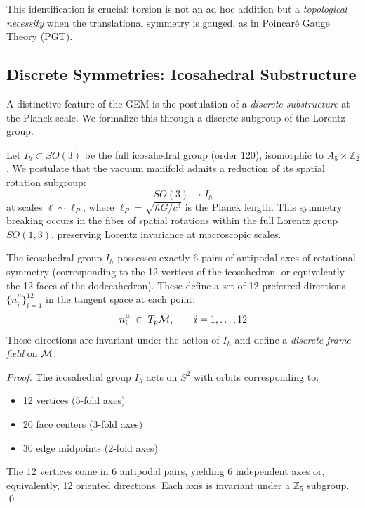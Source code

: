 This identification is crucial: torsion is not an ad hoc addition but a \textit{topological necessity} when the translational symmetry is gauged, as in Poincaré Gauge Theory (PGT).

\subsection{Discrete Symmetries: Icosahedral Substructure}

A distinctive feature of the GEM is the postulation of a \textit{discrete substructure} at the Planck scale. We formalize this through a discrete subgroup of the Lorentz group.


\begin{definition}
Let $I_h \subset SO(3)$ be the full icosahedral group (order 120), isomorphic to $A_5 \times \mathbb{Z}_2$. We postulate that the vacuum manifold admits a reduction of its spatial rotation subgroup:
\begin{equation}
    SO(3) \longrightarrow I_h
\end{equation}
at scales $\ell \sim \ell_P$, where $\ell_P = \sqrt{\hbar G/c^3}$ is the Planck length. This symmetry breaking occurs in the fiber of spatial rotations within the full Lorentz group $SO(1,3)$, preserving Lorentz invariance at macroscopic scales.
\end{definition}

\begin{theorem}
\label{thm:12lines}
The icosahedral group $I_h$ possesses exactly 6 pairs of antipodal axes of rotational symmetry (corresponding to the 12 vertices of the icosahedron, or equivalently the 12 faces of the dodecahedron). These define a set of 12 preferred directions $\{n_i^\mu\}_{i=1}^{12}$ in the tangent space at each point:
\begin{equation}
    n_i^\mu \;\in\; T_p\mathcal{M}, \qquad i = 1, \dots, 12
\end{equation}
These directions are invariant under the action of $I_h$ and define a \textit{discrete frame field} on $\mathcal{M}$.
\end{theorem}

\begin{proof}
The icosahedral group $I_h$ acts on $S^2$ with orbits corresponding to:
\begin{itemize}
    \item 12 vertices (5-fold axes)
    \item 20 face centers (3-fold axes)
    \item 30 edge midpoints (2-fold axes)
\end{itemize}
The 12 vertices come in 6 antipodal pairs, yielding 6 independent axes or, equivalently, 12 oriented directions. Each axis is invariant under a $\mathbb{Z}_5$ subgroup. \qed
\end{proof}

